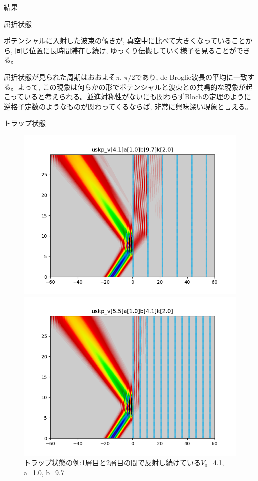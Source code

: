 \documentclass[a4paper, lualatex]{bxjsarticle}
\begin{document}
\begin{section}{結果}
\begin{subsection}{屈折状態}
    \par ポテンシャルに入射した波束の傾きが, 真空中に比べて大きくなっていることから, 同じ位置に長時間滞在し続け, ゆっくり伝搬していく様子を見ることができる。
    \par 屈折状態が見られた周期はおおよそ$\pi$, $\pi/2$であり, de Broglie波長の平均に一致する。よって, この現象は何らかの形でポテンシャルと波束との共鳴的な現象が起こっていると考えられる。並進対称性がないにも関わらずBlochの定理のように逆格子定数のようなものが関わってくるならば, 非常に興味深い現象と言える。
    \end{subsection}

    \begin{subsection}{トラップ状態}
        \begin{figure}[h]
            \begin{minipage}{0.5\hsize}
                \centering
                \includegraphics[width=0.9\hsize]{trap1.png}
                \caption{トラップ状態の例:1層目と2層目の間で反射し続けている$V_0$=4.1, a=1.0, b=9.7}
                \label{trap_tempo}
            \end{minipage}
            \begin{minipage}{0.5\hsize}
                \centering
                \includegraphics[width=0.9\hsize]{trap4.png}

\end{minipage}
\end{figure}
\end{subsection}
\end{section}
\end{document}
